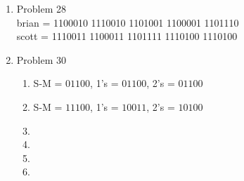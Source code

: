 \begin{enumerate}[leftmargin=2cm,labelsep=.5cm,label=\bf\arabic*.]
\item Problem 28\\
brian = 1100010 1110010 1101001 1100001 1101110\\
scott = 1110011 1100011 1101111 1110100 1110100\\[1cm]

\item Problem 30
\begin{enumerate}
  \item S-M = $01100$, 1's = $01100$, 2's = $01100$
  \item S-M = $11100$, 1's = $10011$, 2's = $10100$
  \item
  \item
  \item
  \item
\end{enumerate}

\end{enumerate}